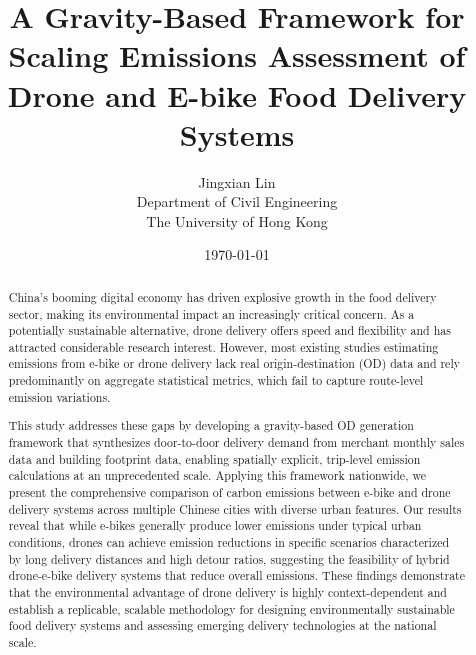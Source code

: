 \documentclass[11pt]{article}
\title{A Gravity-Based Framework for Scaling Emissions Assessment of Drone and E-bike Food Delivery Systems}
\author{Jingxian Lin\\Department of Civil Engineering\\The University of Hong Kong}
\date{\today}
\begin{document}
\maketitle

\begin{abstract}
  China's booming digital economy has driven explosive growth in the food delivery sector, making its environmental impact an increasingly critical concern. As a potentially sustainable alternative, drone delivery offers speed and flexibility and has attracted considerable research interest. However, most existing studies estimating emissions from e-bike or drone delivery lack real origin-destination (OD) data and rely predominantly on aggregate statistical metrics, which fail to capture route-level emission variations.

  This study addresses these gaps by developing a gravity-based OD generation framework that synthesizes door-to-door delivery demand from merchant monthly sales data and building footprint data, enabling spatially explicit, trip-level emission calculations at an unprecedented scale. Applying this framework nationwide, we present the comprehensive comparison of carbon emissions between e-bike and drone delivery systems across multiple Chinese cities with diverse urban features. Our results reveal that while e-bikes generally produce lower emissions under typical urban conditions, drones can achieve emission reductions in specific scenarios characterized by long delivery distances and high detour ratios, suggesting the feasibility of hybrid drone-e-bike delivery systems that reduce overall emissions. These findings demonstrate that the environmental advantage of drone delivery is highly context-dependent and establish a replicable, scalable methodology for designing environmentally sustainable food delivery systems and assessing emerging delivery technologies at the national scale.
\end{abstract}
\end{document}
